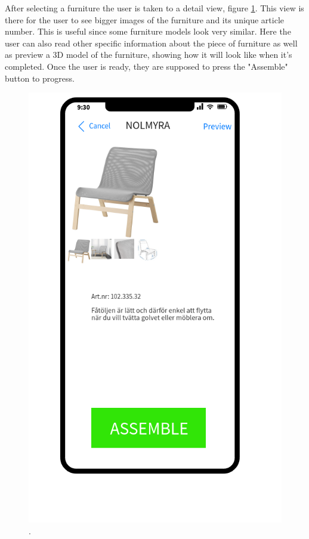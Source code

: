 After selecting a furniture the user is taken to a detail view, figure \ref{fig:detail-view}. This view is there for the user to see bigger images of the furniture and its unique article number. This is useful since some furniture models look very similar. Here the user can also read other specific information about the piece of furniture as well as preview a 3D model of the furniture, showing how it will look like when it's completed. Once the user is ready, they are supposed to press the "Assemble" button to progress.
 
\begin{figure}[hbtp]
\begin{center}
\includegraphics[height = 0.4\textheight]{./Images/Detail_view.png}
\caption{.}
\label{fig:detail-view}
\end{center}
\end{figure}


